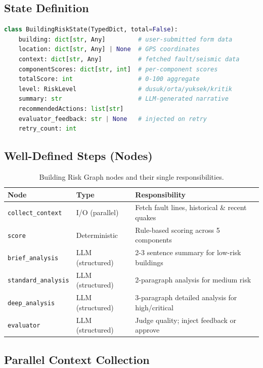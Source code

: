 \documentclass[11pt,a4paper]{article}
\begin{document}
\subsection{State Definition}

\begin{lstlisting}[style=codestyle, language=Python]
class BuildingRiskState(TypedDict, total=False):
    building: dict[str, Any]         # user-submitted form data
    location: dict[str, Any] | None  # GPS coordinates
    context: dict[str, Any]          # fetched fault/seismic data
    componentScores: dict[str, int]  # per-component scores
    totalScore: int                  # 0-100 aggregate
    level: RiskLevel                 # dusuk/orta/yuksek/kritik
    summary: str                     # LLM-generated narrative
    recommendedActions: list[str]
    evaluator_feedback: str | None   # injected on retry
    retry_count: int
\end{lstlisting}

\subsection{Well-Defined Steps (Nodes)}

\begin{table}[H]
\centering
\begin{tabular}{@{}lll@{}}
\toprule
\textbf{Node} & \textbf{Type} & \textbf{Responsibility} \\
\midrule
\texttt{collect\_context}    & I/O (parallel)   & Fetch fault lines, historical \& recent quakes \\
\texttt{score}               & Deterministic    & Rule-based scoring across 5 components \\
\texttt{brief\_analysis}     & LLM (structured) & 2-3 sentence summary for low-risk buildings \\
\texttt{standard\_analysis}  & LLM (structured) & 2-paragraph analysis for medium risk \\
\texttt{deep\_analysis}      & LLM (structured) & 3-paragraph detailed analysis for high/critical \\
\texttt{evaluator}           & LLM (structured) & Judge quality; inject feedback or approve \\
\bottomrule
\end{tabular}
\caption{Building Risk Graph nodes and their single responsibilities.}
\end{table}

\subsection{Parallel Context Collection}
\end{document}
